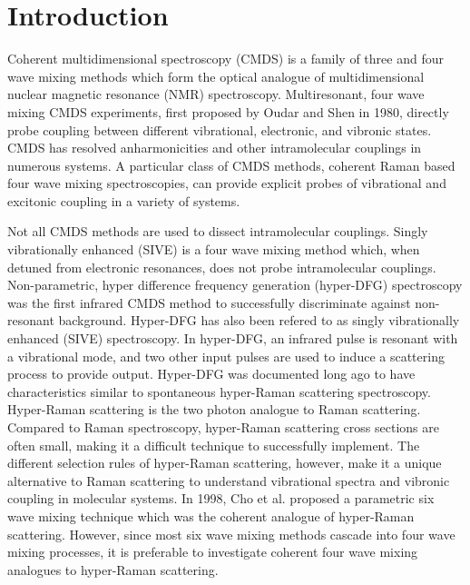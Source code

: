 \documentclass[aip, jcp, reprint, onecolumn]{revtex4-2}
\begin{document}
\section{Introduction}
Coherent multidimensional spectroscopy (CMDS) is a family of three and four wave mixing methods which form the optical analogue of multidimensional nuclear magnetic resonance (NMR) spectroscopy.\cite{Cho2008, RN335}
Multiresonant, four wave mixing CMDS experiments, first proposed by Oudar and Shen in 1980,\cite{RN307} directly probe coupling between different vibrational, electronic, and vibronic states. \cite{RN307, RN281, RN342, Cho2008, RN335, Ogilvie2019, RN325} 
CMDS has resolved anharmonicities and other intramolecular couplings in numerous systems. \cite{RN345, RN342, RN343, RN324, RN329, RN120, Czech2015, Gaynor2017, Ogilvie2019, RN325}
A particular class of CMDS methods, coherent Raman based four wave mixing spectroscopies, can provide explicit probes of vibrational and excitonic coupling in a variety of systems.

Not all CMDS methods are used to dissect intramolecular couplings.\cite{Shen1987_CPL}
Singly vibrationally enhanced (SIVE) is a four wave mixing method which, when detuned from  electronic resonances, does not probe intramolecular couplings. 
Non-parametric, hyper difference frequency generation (hyper-DFG) spectroscopy was the first infrared CMDS method to successfully discriminate against non-resonant background.\cite{RN351, RN352}
Hyper-DFG has also been refered to as singly vibrationally enhanced (SIVE) spectroscopy. \cite{RN351}
In hyper-DFG, an infrared pulse is resonant with a vibrational mode, and two other input pulses are used to induce a scattering process to provide output.
Hyper-DFG was documented long ago to have characteristics similar to spontaneous hyper-Raman scattering spectroscopy. \cite{RN352}
Hyper-Raman scattering is the two photon analogue to Raman scattering. \cite{Cyvin1965, Terhune1965}
Compared to Raman spectroscopy, hyper-Raman scattering cross sections are often small, making it a difficult technique to successfully implement.\cite{RN515, Kelley2010} 
The different selection rules of hyper-Raman scattering, however, make it a unique alternative to Raman scattering to understand vibrational spectra and vibronic coupling in molecular systems.
In 1998, Cho et al. proposed a parametric six wave mixing technique which was the coherent analogue of hyper-Raman scattering. \cite{Cho1998}
However, since most six wave mixing methods cascade into four wave mixing processes,\cite{RN243, Cho2000_Cascade} it is preferable to investigate coherent four wave mixing analogues to hyper-Raman scattering.
\end{document}
